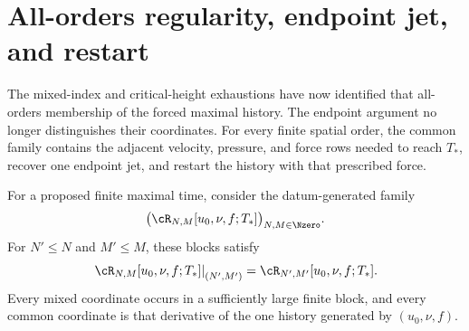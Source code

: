 \section{All-orders regularity, endpoint jet, and restart}

The mixed-index and critical-height exhaustions have now identified that
all-orders membership of the forced maximal history.  The endpoint argument
no longer distinguishes their coordinates.  For every finite spatial order,
the common family contains the adjacent velocity, pressure, and force rows
needed to reach \(T_*\), recover one endpoint jet, and restart the history with
that prescribed force.


\begin{definition}
\label{f:def:compatible-intersection}
For a proposed finite maximal time, consider the datum-generated family
\begin{equation}
 \bigl(\cR_{N,M}[u_0,\nu,f;T_*]\bigr)_{N,M\in\Nzero}.
 \label{f:eq:compatible-intersection-space}
\end{equation}
For \(N'\le N\) and \(M'\le M\), these blocks satisfy
\begin{equation}
 \left.\cR_{N,M}[u_0,\nu,f;T_*]\right|_{(N',M')}
 =\cR_{N',M'}[u_0,\nu,f;T_*].
 \label{f:eq:compatible-intersection}
\end{equation}
Every mixed coordinate occurs in a sufficiently large finite block, and every
common coordinate is that derivative of the one history generated by
\((u_0,\nu,f)\).
\end{definition}

